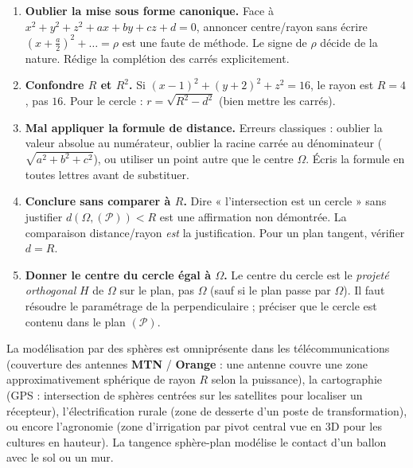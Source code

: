 \documentclass[11pt]{article}
\begin{document}
\begin{attention}
\begin{enumerate}
\item \textbf{Oublier la mise sous forme canonique.} Face à $x^2+y^2+z^2+ax+by+cz+d=0$, annoncer centre/rayon sans écrire $\left(x+\frac{a}{2}\right)^2+\dots = \rho$ est une faute de méthode. Le signe de $\rho$ décide de la nature. Rédige la complétion des carrés explicitement.
\item \textbf{Confondre $R$ et $R^2$.} Si $(x-1)^2+(y+2)^2+z^2=16$, le rayon est $R=4$, pas $16$. Pour le cercle : $r=\sqrt{R^2-d^2}$ (bien mettre les carrés).
\item \textbf{Mal appliquer la formule de distance.} Erreurs classiques : oublier la valeur absolue au numérateur, oublier la racine carrée au dénominateur ($\sqrt{a^2+b^2+c^2}$), ou utiliser un point autre que le centre $\Omega$. Écris la formule en toutes lettres avant de substituer.
\item \textbf{Conclure sans comparer à $R$.} Dire « l'intersection est un cercle » sans justifier $d(\Omega,(\mathcal{P}))<R$ est une affirmation non démontrée. La comparaison distance/rayon \emph{est} la justification. Pour un plan tangent, vérifier $d=R$.
\item \textbf{Donner le centre du cercle égal à $\Omega$.} Le centre du cercle est le \emph{projeté orthogonal} $H$ de $\Omega$ sur le plan, pas $\Omega$ (sauf si le plan passe par $\Omega$). Il faut résoudre le paramétrage de la perpendiculaire ; préciser que le cercle est contenu dans le plan $(\mathcal{P})$.
\end{enumerate}
\end{attention}

\begin{savaistu}
La modélisation par des sphères est omniprésente dans les télécommunications (couverture des antennes \textbf{MTN} / \textbf{Orange} : une antenne couvre une zone approximativement sphérique de rayon $R$ selon la puissance), la cartographie (GPS : intersection de sphères centrées sur les satellites pour localiser un récepteur), l'électrification rurale (zone de desserte d'un poste de transformation), ou encore l'agronomie (zone d'irrigation par pivot central vue en 3D pour les cultures en hauteur). La tangence sphère-plan modélise le contact d'un ballon avec le sol ou un mur.
\end{savaistu}
\end{document}
